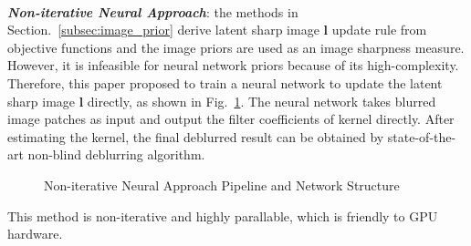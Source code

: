 \documentclass[journal, onecolumn, 10pt]{IEEEtran}
\begin{document}
~\\
\textbf{\emph{Non-iterative Neural Approach}}\cite{chakrabarti2016neural}: the methods in Section.~\ref{subsec:image_prior} derive latent sharp image $\mathbf{l}$ update rule from objective functions and the image priors are used as an image sharpness measure. However, it is infeasible for neural network priors because of its high-complexity. Therefore, this paper proposed to train a neural network to update the latent sharp image  $\mathbf{l}$ directly, as shown in Fig.~\ref{fig:non_iterative_nn}. The neural network takes blurred image patches as input and output the filter coefficients of kernel directly. After estimating the kernel, the final deblurred result can be obtained by state-of-the-art non-blind deblurring algorithm.
\begin{figure}[h!]
\centering
{}
\hspace{\fill}
\hspace{\fill}
\caption{Non-iterative Neural Approach Pipeline and Network Structure}
\label{fig:non_iterative_nn}
\end{figure}
This method is non-iterative and highly parallable, which is friendly to GPU hardware.
\end{document}
